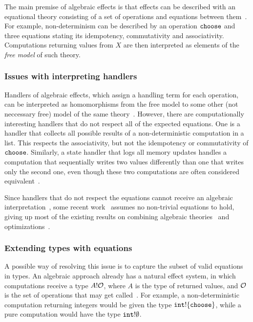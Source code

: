 \documentclass[a4paper,UKenglish]{dagrep}
\begin{document}
The main premise of algebraic effects is that effects can be described with an equational theory consisting of a set of operations and equations between them~\cite{DBLP:journals/acs/PlotkinP03}. For example, non-determinism can be described by an operation $\mathtt{choose}$ and three equations stating its idempotency, commutativity and associativity. Computations returning values from $X$ are then interpreted as elements of the \emph{free model} of such theory.

\subsubsection*{Issues with interpreting handlers}

Handlers of algebraic effects, which assign a handling term for each operation, can be interpreted as homomorphisms from the free model to some other (not neccessary free) model of the same theory~\cite{DBLP:journals/corr/PlotkinP13}. However, there are computationally interesting handlers that do not respect all of the expected equations. One is a handler that collects all possible results of a non-deterministic computation in a list. This respects the associativity, but not the idempotency or commutativity of $\mathtt{choose}$. Similarly, a state handler that logs all memory updates handles a computation that sequentially writes two values differently than one that writes only the second one, even though these two computations are often considered equivalent~\cite{DBLP:conf/fossacs/PlotkinP02}.

Since handlers that do not respect the equations cannot receive an algebraic interpretation~\cite{DBLP:journals/corr/PlotkinP13}, some recent work~\cite{DBLP:journals/corr/BauerP13,DBLP:conf/icfp/KammarLO13} assumes no non-trivial equations to hold, giving up most of the existing results on combining algebraic theories~\cite{DBLP:journals/tcs/HylandPP06} and optimizations~\cite{DBLP:conf/popl/KammarP12}.

\subsubsection*{Extending types with equations}

A possible way of resolving this issue is to capture the subset of valid equations in types. An algebraic approach already has a natural effect system, in which computations receive a type $A ! \mathcal{O}$, where $A$ is the type of returned values, and $\mathcal{O}$ is the set of operations that may get called~\cite{DBLP:journals/corr/BauerP13,DBLP:conf/icfp/KammarLO13}. For example, a non-deterministic computation returning integers would be given the type $\mathtt{int} ! \{ \mathtt{choose} \}$, while a pure computation would have the type $\mathtt{int} ! \emptyset$.
\end{document}
